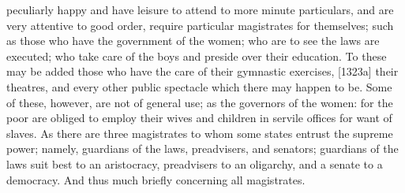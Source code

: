 peculiarly happy and have leisure to attend to more minute particulars,
and are very attentive to good order, require particular magistrates for
themselves; such as those who have the government of the women; who are to
see the laws are executed; who take care of the boys and preside over
their education. To these may be added those who have the care of their
gymnastic exercises, [1323a] their theatres, and every other public
spectacle which there may happen to be. Some of these, however, are not of
general use; as the governors of the women: for the poor are obliged to
employ their wives and children in servile offices for want of slaves. As
there are three magistrates to whom some states entrust the supreme power;
namely, guardians of the laws, preadvisers, and senators; guardians of the
laws suit best to an aristocracy, preadvisers to an oligarchy, and a
senate to a democracy. And thus much briefly concerning all magistrates.



